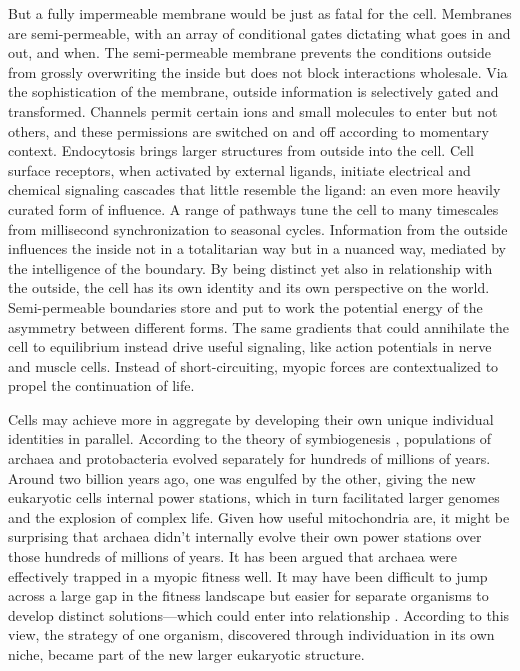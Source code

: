 \documentclass[11pt]{article}
\begin{document}
But a fully impermeable membrane would be just as fatal for the cell. Membranes are semi-permeable, with an array of conditional gates dictating what goes in and out, and when. The semi-permeable membrane prevents the conditions outside from grossly overwriting the inside but does not block interactions wholesale. Via the sophistication of the membrane, outside information is selectively gated and transformed. Channels permit certain ions and small molecules to enter but not others, and these permissions are switched on and off according to momentary context. Endocytosis brings larger structures from outside into the cell. Cell surface receptors, when activated by external ligands, initiate electrical and chemical signaling cascades that little resemble the ligand: an even more heavily curated form of influence. A range of pathways tune the cell to many timescales from millisecond synchronization to seasonal cycles. Information from the outside influences the inside not in a totalitarian way but in a nuanced way, mediated by the intelligence of the boundary. By being distinct yet also in relationship with the outside, the cell has its own identity and its own perspective on the world. Semi-permeable boundaries store and put to work the potential energy of the asymmetry between different forms. The same gradients that could annihilate the cell to equilibrium instead drive useful signaling, like action potentials in nerve and muscle cells. Instead of short-circuiting, myopic forces are contextualized to propel the continuation of life.






Cells may achieve more in aggregate by developing their own unique individual identities in parallel. According to the theory of symbiogenesis \citep{margulis1995what, margulis1986microcosmos, sapp1994evolution}, populations of archaea and protobacteria evolved separately for hundreds of millions of years. Around two billion years ago, one was engulfed by the other, giving the new eukaryotic cells internal power stations, which in turn facilitated larger genomes and the explosion of complex life. Given how useful mitochondria are, it might be surprising that archaea didn't internally evolve their own power stations over those hundreds of millions of years. It has been argued that archaea were effectively trapped in a myopic fitness well. It may have been difficult to jump across a large gap in the fitness landscape but easier for separate organisms to develop distinct solutions---which could enter into relationship \citep{lane2010energetics, smith1997major}. According to this view, the strategy of one organism, discovered through individuation in its own niche, became part of the new larger eukaryotic structure.
\end{document}
